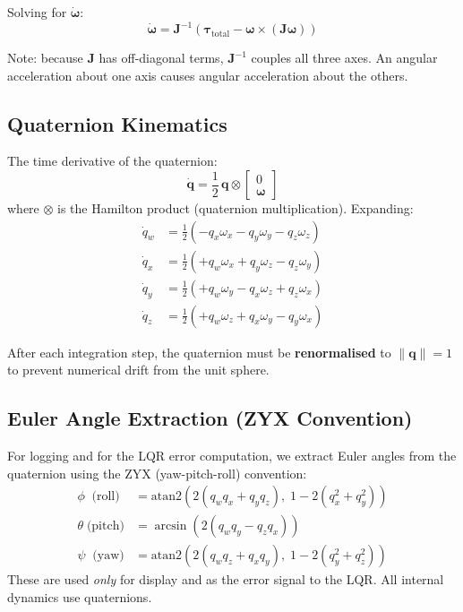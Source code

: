 \documentclass[12pt, a4paper]{article}
\newcommand{\bq}{\bm{q}}
\newcommand{\bomega}{\bm{\omega}}
\newcommand{\btau}{\bm{\tau}}
\newcommand{\bJ}{\bm{J}}
\begin{document}
Solving for $\dot{\bomega}$:
\begin{equation}
    \dot{\bomega} = \bJ^{-1} \left( \btau_{\text{total}} - \bomega \times (\bJ \bomega) \right)
\end{equation}

Note: because $\bJ$ has off-diagonal terms, $\bJ^{-1}$ couples all three axes.  An angular acceleration about one axis causes angular acceleration about the others.

\subsection{Quaternion Kinematics}

The time derivative of the quaternion:
\begin{equation}
    \dot{\bq} = \frac{1}{2} \, \bq \otimes \begin{bmatrix} 0 \\ \bomega \end{bmatrix}
    \label{eq:quat_kin}
\end{equation}
where $\otimes$ is the Hamilton product (quaternion multiplication).  Expanding:
\begin{align}
    \dot{q}_w &= \tfrac{1}{2} (-q_x \omega_x - q_y \omega_y - q_z \omega_z) \\
    \dot{q}_x &= \tfrac{1}{2} (+q_w \omega_x + q_y \omega_z - q_z \omega_y) \\
    \dot{q}_y &= \tfrac{1}{2} (+q_w \omega_y - q_x \omega_z + q_z \omega_x) \\
    \dot{q}_z &= \tfrac{1}{2} (+q_w \omega_z + q_x \omega_y - q_y \omega_x)
\end{align}

After each integration step, the quaternion must be \textbf{renormalised} to $\|\bq\| = 1$ to prevent numerical drift from the unit sphere.

\subsection{Euler Angle Extraction (ZYX Convention)}

For logging and for the LQR error computation, we extract Euler angles from the quaternion using the ZYX (yaw-pitch-roll) convention:
\begin{align}
    \phi \;\;\text{(roll)} &= \text{atan2}(2(q_w q_x + q_y q_z), \; 1 - 2(q_x^2 + q_y^2)) \\
    \theta \;\text{(pitch)} &= \arcsin(2(q_w q_y - q_z q_x)) \\
    \psi \;\;\text{(yaw)} &= \text{atan2}(2(q_w q_z + q_x q_y), \; 1 - 2(q_y^2 + q_z^2))
\end{align}
These are used \emph{only} for display and as the error signal to the LQR.  All internal dynamics use quaternions.
\end{document}
